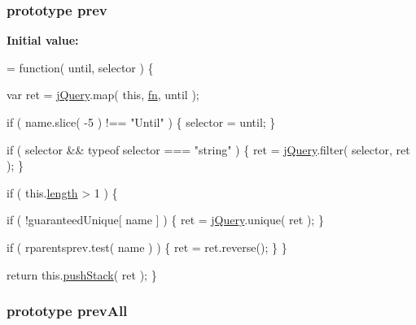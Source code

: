 \hypertarget{jquery-1_810_82-vsdoc_8js_a7352f8050024693a3c6cce9e507d4af2}{
\subsubsection[{prev}]{ {\bf prototype} prev}}\label{jquery-1_810_82-vsdoc_8js_a7352f8050024693a3c6cce9e507d4af2}
{\bfseries Initial value\-:}
\begin{DoxyCode}
= \textcolor{keyword}{function}( until, selector ) \{


        var ret = \hyperlink{jquery-1_810_82-vsdoc_8js_add5237586d970a38a81f990e8eb28c6c}{jQuery}.map( \textcolor{keyword}{this}, \hyperlink{jquery-1_810_82-vsdoc_8js_acef6bdaf6b9b20fdcca1ea86f0902c3b}{fn}, until );

        \textcolor{keywordflow}{if} ( name.slice( -5 ) !== \textcolor{stringliteral}{"Until"} ) \{
            selector = until;
        \}

        \textcolor{keywordflow}{if} ( selector && typeof selector === \textcolor{stringliteral}{"string"} ) \{
            ret = \hyperlink{jquery-1_810_82-vsdoc_8js_add5237586d970a38a81f990e8eb28c6c}{jQuery}.filter( selector, ret );
        \}

        \textcolor{keywordflow}{if} ( this.\hyperlink{jquery-1_810_82-vsdoc_8js_aa7de35d58da66d9944ab9cbe82c19640}{length} > 1 ) \{
            
            \textcolor{keywordflow}{if} ( !guaranteedUnique[ name ] ) \{
                ret = \hyperlink{jquery-1_810_82-vsdoc_8js_add5237586d970a38a81f990e8eb28c6c}{jQuery}.unique( ret );
            \}

            
            \textcolor{keywordflow}{if} ( rparentsprev.test( name ) ) \{
                ret = ret.reverse();
            \}
        \}

        \textcolor{keywordflow}{return} this.\hyperlink{jquery-1_810_82-vsdoc_8js_afc3a7db1ef2b526338c06c07cecccd44}{pushStack}( ret );
    \}
\end{DoxyCode}
\hypertarget{jquery-1_810_82-vsdoc_8js_a919573a4164877583504b17f0594a6a1}{
\subsubsection[{prev\-All}]{ {\bf prototype} prev\-All}}\label{jquery-1_810_82-vsdoc_8js_a919573a4164877583504b17f0594a6a1}
